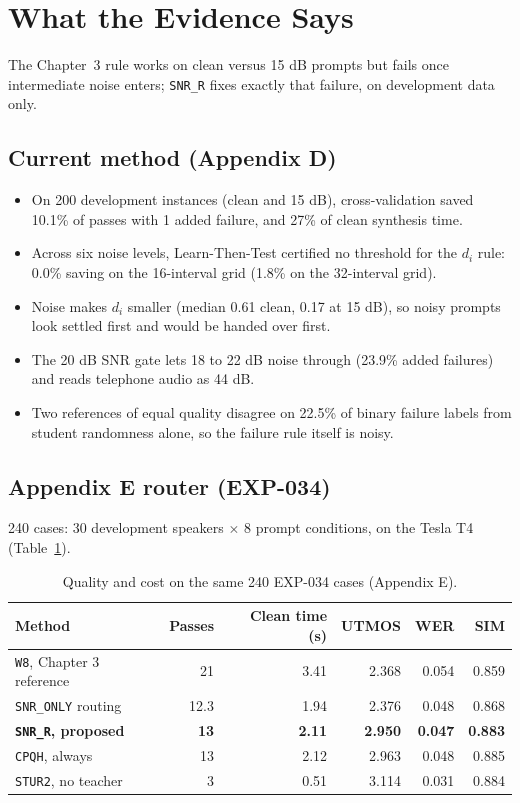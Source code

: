\documentclass[11pt,a4paper]{article}
\newcommand{\snrr}{\texttt{SNR\_R}}
\begin{document}
\section{What the Evidence Says}

The Chapter~3 rule works on clean versus 15 dB prompts but fails once intermediate noise enters; \snrr{} fixes exactly that failure, on development data only.

\subsection*{Current method (Appendix D)}
\begin{itemize}[leftmargin=1.3em]
\item On 200 development instances (clean and 15 dB), cross-validation saved 10.1\% of passes with 1 added failure, and 27\% of clean synthesis time.
\item Across six noise levels, Learn-Then-Test certified no threshold for the $d_i$ rule: 0.0\% saving on the 16-interval grid (1.8\% on the 32-interval grid).
\item Noise makes $d_i$ smaller (median 0.61 clean, 0.17 at 15 dB), so noisy prompts look settled first and would be handed over first.
\item The 20 dB SNR gate lets 18 to 22 dB noise through (23.9\% added failures) and reads telephone audio as 44 dB.
\item Two references of equal quality disagree on 22.5\% of binary failure labels from student randomness alone, so the failure rule itself is noisy.
\end{itemize}

\subsection*{Appendix E router (EXP-034)}
240 cases: 30 development speakers $\times$ 8 prompt conditions, on the Tesla T4 (Table~\ref{tab:evidence}).

\begin{table}[!htbp]
\centering\small
\caption{Quality and cost on the same 240 EXP-034 cases (Appendix E).}
\label{tab:evidence}
\begin{tabular}{@{}l r r r r r@{}}
\toprule
\textbf{Method} & \textbf{Passes} & \textbf{Clean time (s)} & \textbf{UTMOS} & \textbf{WER} & \textbf{SIM} \\
\midrule
\texttt{W8}, Chapter 3 reference & 21 & 3.41 & 2.368 & 0.054 & 0.859 \\
\texttt{SNR\_ONLY} routing & 12.3 & 1.94 & 2.376 & 0.048 & 0.868 \\
\textbf{\snrr, proposed} & \textbf{13} & \textbf{2.11} & \textbf{2.950} & \textbf{0.047} & \textbf{0.883} \\
\texttt{CPQH}, always & 13 & 2.12 & 2.963 & 0.048 & 0.885 \\
\texttt{STUR2}, no teacher & 3 & 0.51 & 3.114 & 0.031 & 0.884 \\
\bottomrule
\end{tabular}
\end{table}
\end{document}
